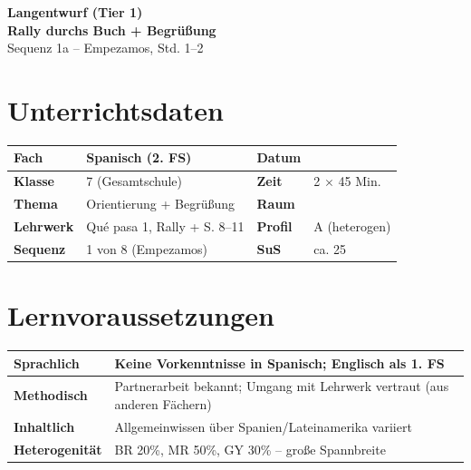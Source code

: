 \documentclass[11pt,a4paper]{article}
\begin{document}
\begin{center}
{\Large\textbf{\textcolor{spanisch}{Langentwurf (Tier 1)}}}\\[0.5em]
{\LARGE\textbf{Rally durchs Buch + Begrüßung}}\\[0.3em]
{\large Sequenz 1a -- Empezamos, Std. 1--2}
\end{center}

\vspace{1em}

\section*{Unterrichtsdaten}

\begin{tabularx}{\textwidth}{|l|X|l|X|}
\hline
\textbf{Fach} & Spanisch (2. FS) & \textbf{Datum} & \\
\hline
\textbf{Klasse} & 7 (Gesamtschule) & \textbf{Zeit} & 2 $\times$ 45 Min. \\
\hline
\textbf{Thema} & Orientierung + Begrüßung & \textbf{Raum} & \\
\hline
\textbf{Lehrwerk} & Qué pasa 1, Rally + S. 8--11 & \textbf{Profil} & A (heterogen) \\
\hline
\textbf{Sequenz} & 1 von 8 (Empezamos) & \textbf{SuS} & ca. 25 \\
\hline
\end{tabularx}

\vspace{1em}

\section*{Lernvoraussetzungen}

\begin{tabularx}{\textwidth}{|l|X|}
\hline
\textbf{Sprachlich} & Keine Vorkenntnisse in Spanisch; Englisch als 1. FS \\
\hline
\textbf{Methodisch} & Partnerarbeit bekannt; Umgang mit Lehrwerk vertraut (aus anderen Fächern) \\
\hline
\textbf{Inhaltlich} & Allgemeinwissen über Spanien/Lateinamerika variiert \\
\hline
\textbf{Heterogenität} & BR 20\%, MR 50\%, GY 30\% -- große Spannbreite \\
\hline
\end{tabularx}
\end{document}
